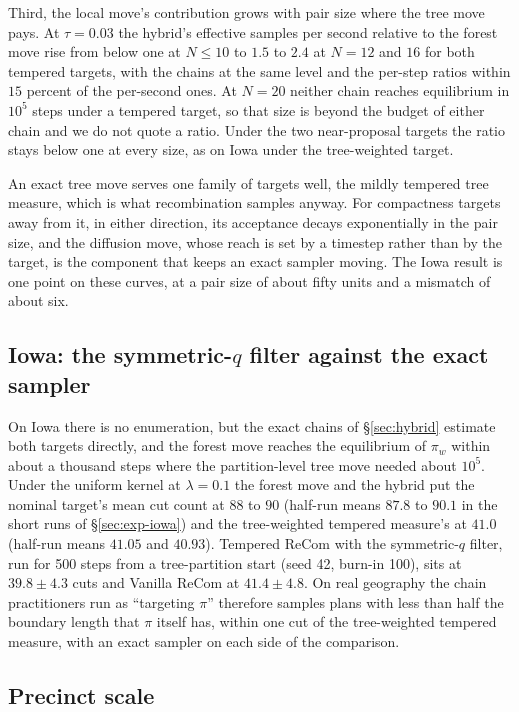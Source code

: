 \documentclass[11pt]{article}
\begin{document}
Third, the local move's contribution grows with pair size where the
tree move pays. At $\tau = 0.03$ the hybrid's effective samples per
second relative to the forest move rise from below one at $N \le 10$
to $1.5$ to $2.4$ at $N = 12$ and $16$ for both tempered targets, with
the chains at the same level and the per-step ratios within $15$
percent of the per-second ones. At $N = 20$ neither chain reaches
equilibrium in $10^5$ steps under a tempered target, so that size is
beyond the budget of either chain and we do not quote a ratio. Under
the two near-proposal targets the ratio stays below one at every
size, as on Iowa under the tree-weighted target.

An exact tree move serves one family of targets well, the mildly
tempered tree measure, which is what recombination samples anyway. For
compactness targets away from it, in either direction, its acceptance
decays exponentially in the pair size, and the diffusion move, whose
reach is set by a timestep rather than by the target, is the component
that keeps an exact sampler moving. The Iowa result is one point on
these curves, at a pair size of about fifty units and a mismatch of
about six.

\subsection{Iowa: the symmetric-\texorpdfstring{$q$}{q} filter against the exact sampler}\label{sec:exp-iowa-calib}

On Iowa there is no enumeration, but the exact chains of
\S\ref{sec:hybrid} estimate both targets directly, and the forest
move reaches the equilibrium of $\pi_w$ within about a thousand steps
where the partition-level tree move needed about $10^5$. Under the
uniform kernel at $\lambda = 0.1$ the forest move and the hybrid put
the nominal target's mean cut count at $88$ to $90$ (half-run means $87.8$ to $90.1$ in the
short runs of \S\ref{sec:exp-iowa}) and the tree-weighted
tempered measure's at $41.0$ (half-run means $41.05$ and $40.93$).
Tempered ReCom with the symmetric-$q$ filter, run for 500 steps from
a tree-partition start (seed 42, burn-in 100), sits at $39.8 \pm 4.3$
cuts and Vanilla ReCom at $41.4 \pm 4.8$. On real geography the chain
practitioners run as ``targeting $\pi$'' therefore samples plans with
less than half the boundary length that $\pi$ itself has, within one
cut of the tree-weighted tempered measure, with an exact sampler on
each side of the comparison.

\subsection{Precinct scale}\label{sec:exp-precinct}
\end{document}
